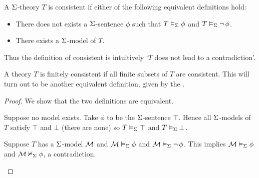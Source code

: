 \begin{dfn}
    A $\Sigma$-theory $T$ is consistent if either of the following equivalent 
    definitions hold:
    \begin{itemize}
        \item
            There does not exists a 
            $\Sigma$-sentence $\phi$ such that
            $T \vDash_{\Sigma} \phi$ and $T \vDash_{\Sigma} \neg\, \phi$.
        \item There exists 
            a $\Sigma$-model of $T$. 
    \end{itemize}
    Thus the definition of consistent is intuitively 
    `$T$ does not lead to a contradiction'.

    A theory $T$ is finitely consistent if all 
    finite subsets of $T$ are consistent.
    This will turn out to be another equivalent definition,
    given by the .
\end{dfn}
\begin{proof} 
    We show that the two definitions are equivalent.
    \begin{forward}
        Suppose no model exists.
        Take $\phi$ to be the $\Sigma$-sentence $\top$.
        Hence all $\Sigma$-models of $T$ satisfy $\top$ and $\bot$
        (there are none) so
        $T \vDash_{\Sigma} \top$ and $T \vDash_{\Sigma} \bot$.
    \end{forward}
    \begin{backward}
        Suppose $T$ has a $\Sigma$-model $\mathcal{M}$
        and $\mathcal{M} \vDash_{\Sigma} \phi$ and $\mathcal{M} \vDash_{\Sigma} \neg\, \phi$.
        This implies $\mathcal{M} \vDash_{\Sigma} \phi$ and $\mathcal{M} \nvDash_{\Sigma} \phi$,
        a contradiction.
    \end{backward}
\end{proof}